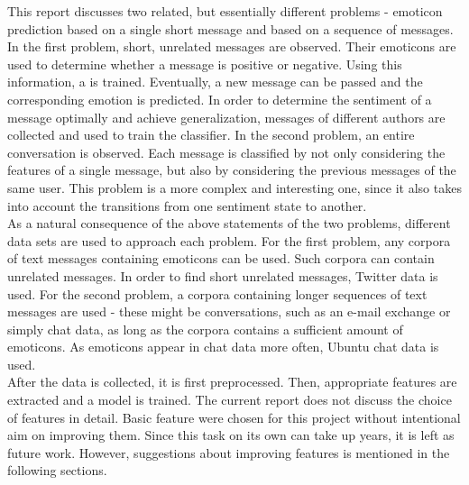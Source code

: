 \begin{comment}
Introduction (max 2 pages):
• Description of the problem area and the problem itself
• What is the research question / goal?
• Why is this an important / meaningful / interesting problem to consider?
• The very basic idea of the approach and why this is a reasonable approach for this problem?
\end{comment}


This report discusses two related, but essentially different problems - emoticon prediction based on a single short message and based on a sequence of messages. In the first problem, short, unrelated messages are observed. Their emoticons are used to determine whether a message is positive or negative. Using this information, a is trained. Eventually, a new message can be passed and the corresponding emotion is predicted. In order to determine the sentiment of a message optimally and achieve generalization, messages of different authors are collected and used to train the classifier. In the second problem, an entire conversation is observed. Each message is classified by not only considering the features of a single message, but also by considering the previous messages of the same user. This problem is a more complex and interesting one, since it also takes into account the transitions from one sentiment state to another. \\

\noindent As a natural consequence of the above statements of the two problems, different data sets are used to approach each problem. For the first problem, any corpora of text messages containing emoticons can be used. Such corpora can contain unrelated messages. In order to find short unrelated messages, Twitter data is used. For the second problem, a corpora containing longer sequences of text messages are used - these might be conversations, such as an e-mail exchange or simply chat data, as long as the corpora contains a sufficient amount of emoticons. As emoticons appear in chat data more often, Ubuntu chat data is used. \\

\noindent After the data is collected, it is first preprocessed. Then, appropriate features are extracted and a model is trained. The current report does not discuss the choice of features in detail. Basic feature were chosen for this project without intentional aim on improving them. Since this task on its own can take up years, it is left as future work. However, suggestions about improving features is mentioned in the following sections. \\

